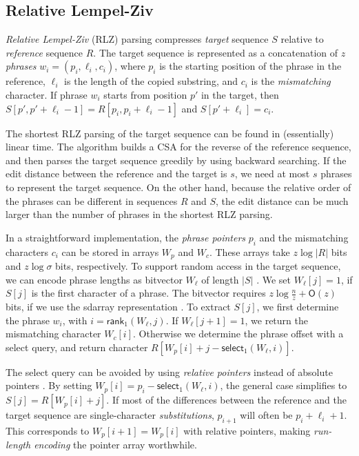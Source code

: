 \documentclass[a4paper,11pt]{llncs}
\newcommand{\abs}[1]{\ensuremath{\lvert #1 \rvert}}
\newcommand{\CSA}{\textsf{CSA}}
\newcommand{\RLZ}{\textsf{RLZ}}
\newcommand{\sdarray}{\textsf{sdarray}}
\newcommand{\select}{\textsf{select}}
\newcommand{\mrank}{\ensuremath{\mathsf{rank}}}
\newcommand{\mselect}{\ensuremath{\mathsf{select}}}
\newcommand{\Oh}{\ensuremath{\mathsf{O}}}
\begin{document}
\subsection{Relative Lempel-Ziv}\label{sect:rlz}

\emph{Relative Lempel-Ziv} (\RLZ) parsing \cite{Kuruppu2010} compresses
\emph{target} sequence $S$ relative to \emph{reference} sequence $R$. The
target sequence is represented as a concatenation of $z$ \emph{phrases} $w_{i}
= (p_{i}, \ell_{i}, c_{i})$, where $p_{i}$ is the starting position of the
phrase in the reference, $\ell_{i}$ is the length of the copied substring, and
$c_{i}$ is the \emph{mismatching} character. If phrase $w_{i}$ starts from
position $p'$ in the target, then $S[p',p'+\ell_{i}-1] =
R[p_{i},p_{i}+\ell_{i}-1]$ and $S[p'+\ell_{i}] = c_{i}$.

The shortest \RLZ{} parsing of the target sequence can be found in
(essentially) linear time. The algorithm builds a \CSA{} for the reverse of
the reference sequence, and then parses the target sequence greedily by using
backward searching. If the edit distance between the reference and the target
is $s$, we need at most $s$ phrases to represent the target sequence. On the
other hand, because the relative order of the phrases can be different in
sequences $R$ and $S$, the edit distance can be much larger than the number of
phrases in the shortest \RLZ{} parsing.

In a straightforward implementation, the \emph{phrase pointers} $p_{i}$ and
the mismatching characters $c_{i}$ can be stored in arrays $W_{p}$ and
$W_{c}$. These arrays take $z \log \abs{R}$ bits and $z \log \sigma$ bits,
respectively. To support random access in the target sequence, we can encode
phrase lengths as bitvector $W_{\ell}$ of length $\abs{S}$ \cite{Kuruppu2010}.
We set $W_{\ell}[j] = 1$, if $S[j]$ is the first character of a phrase. The
bitvector requires $z \log \frac{n}{z} + \Oh(z)$ bits, if we use the
\sdarray{} representation \cite{Okanohara2007}. To extract $S[j]$, we first
determine the phrase $w_{i}$, with $i = \mrank_{1}(W_{\ell}, j)$. If
$W_{\ell}[j+1] = 1$, we return the mismatching character $W_{c}[i]$. Otherwise
we determine the phrase offset with a \select{} query, and return character
$R[W_{p}[i] + j - \mselect_{1}(W_{\ell}, i)]$.

The \select{} query can be avoided by using \emph{relative pointers} instead
of absolute pointers \cite{Ferrada2014}. By setting $W_{p}[i] = p_{i} -
\mselect_{1}(W_{\ell}, i)$, the general case simplifies to $S[j] = R[W_{p}[i]
+ j]$. If most of the differences between the reference and the target
sequence are single-character \emph{substitutions}, $p_{i+1}$ will often be
$p_{i} + \ell_{i} + 1$. This corresponds to $W_{p}[i+1] = W_{p}[i]$ with
relative pointers, making \emph{run-length encoding} the pointer array
worthwhile.
\end{document}
